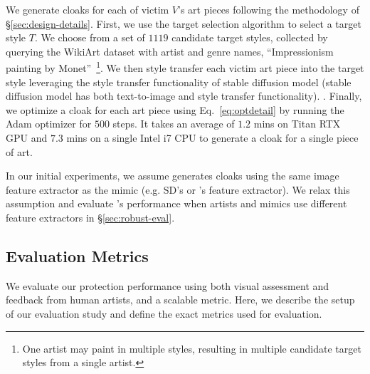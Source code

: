 \vspace{-0.2cm}

 We generate cloaks for each of victim $V$'s
art pieces following the methodology of \S\ref{sec:design-details}. First, we
use the target selection algorithm to select a target style $T$. We choose
from a set of $1119$ candidate target styles, collected by querying the
WikiArt dataset with artist and genre names, \eg ``Impressionism painting by
Monet''~\footnote{One artist may paint in multiple styles, resulting in
  multiple candidate target styles from a single artist.}. We then style
transfer each victim art piece into the target style leveraging the style
transfer functionality of stable diffusion model (stable diffusion model has
both text-to-image and style transfer functionality). . Finally, we optimize a cloak for each art piece
using Eq.~\ref{eq:optdetail} by running the Adam optimizer for $500$
steps.  It takes an average of $1.2$ mins on Titan RTX GPU and $7.3$ mins on a
single Intel i7 CPU to generate a cloak for a single piece of art. 

In our initial experiments, we assume \system{} generates cloaks using the
same image feature extractor as the mimic (e.g. SD's or \dalleM's feature
extractor). We relax this assumption and evaluate
\system{}'s performance when artists and mimics use different feature
extractors in \S\ref{sec:robust-eval}.

\secspace
\subsection{Evaluation Metrics} 
\label{sec:metrics}

We evaluate our protection performance using both visual assessment and feedback from
human artists, and a scalable metric. Here, we describe the setup of our
evaluation study and define the exact metrics used for evaluation.  

